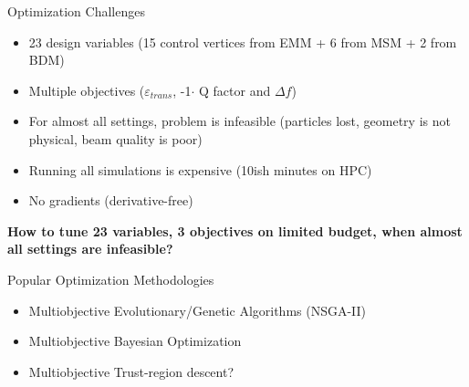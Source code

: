 \documentclass[aspectratio=169]{beamer}
\begin{document}
\begin{frame}{Optimization Challenges}
    \begin{itemize}
        \item 23 design variables (15 control vertices from EMM + 6 from MSM + 2 from BDM)
        \item Multiple objectives ($\varepsilon_{trans}$, -1$\cdot$ Q factor and $\Delta f$)
        \item For almost all settings, problem is infeasible (particles lost, geometry is not physical, beam quality is poor)
        \item Running all simulations is expensive (10ish minutes on HPC)
        \item No gradients (derivative-free)
    \end{itemize}
    
    \pause 
    \bigskip
    
    {\centering \bf How to tune 23 variables, 3 objectives on limited budget, when almost all settings are infeasible?}
    
\end{frame}

\begin{frame}{Popular Optimization Methodologies}
    \begin{itemize}
        \item Multiobjective Evolutionary/Genetic Algorithms (NSGA-II)
        \item Multiobjective Bayesian Optimization
        \pause \item Multiobjective Trust-region descent?
    \end{itemize}
\end{frame}
\end{document}
